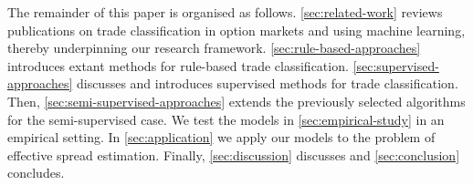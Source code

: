 The remainder of this paper is organised as follows. \cref{sec:related-work} reviews publications on trade classification in option markets and using machine learning, thereby underpinning our research framework. \cref{sec:rule-based-approaches} introduces extant methods for rule-based trade classification. \cref{sec:supervised-approaches} discusses and introduces supervised methods for trade classification. Then, \cref{sec:semi-supervised-approaches} extends the previously selected algorithms for the semi-supervised case. We test the models in \cref{sec:empirical-study} in an empirical setting. In \cref{sec:application} we apply our models to the problem of effective spread estimation. Finally, \cref{sec:discussion} discusses and \cref{sec:conclusion} concludes.
